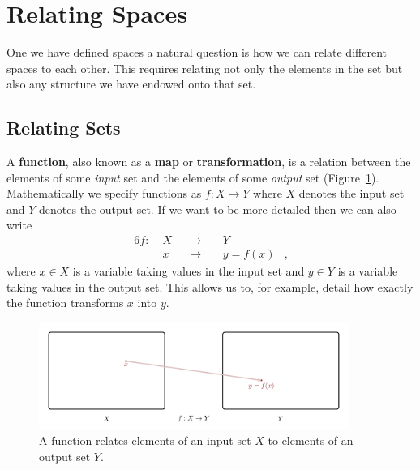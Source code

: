 \documentclass[
  letterpaper,
  DIV=11,
  numbers=noendperiod]{scrartcl}
\begin{document}
\hypertarget{relating-spaces}{%
\section{Relating Spaces}\label{relating-spaces}}

One we have defined spaces a natural question is how we can relate
different spaces to each other. This requires relating not only the
elements in the set but also any structure we have endowed onto that
set.

\hypertarget{relating-sets}{%
\subsection{Relating Sets}\label{relating-sets}}

A \textbf{function}, also known as a \textbf{map} or
\textbf{transformation}, is a relation between the elements of some
\emph{input} set and the elements of some \emph{output} set
(Figure~\ref{fig-function}). Mathematically we specify functions as
\(f : X \rightarrow Y\) where \(X\) denotes the input set and \(Y\)
denotes the output set. If we want to be more detailed then we can also
write \begin{alignat*}{6}
f :\; & X & &\rightarrow& \; & Y &
\\
& x & &\mapsto& & y = f(x) &,
\end{alignat*} where \(x \in X\) is a variable taking values in the
input set and \(y \in Y\) is a variable taking values in the output set.
This allows us to, for example, detail how exactly the function
transforms \(x\) into \(y\).

\begin{figure}

{\centering \includegraphics[width=0.9\textwidth,height=\textheight]{figures/maps/function/function.pdf}

}

\caption{\label{fig-function}A function relates elements of an input set
\(X\) to elements of an output set \(Y\).}

\end{figure}
\end{document}
